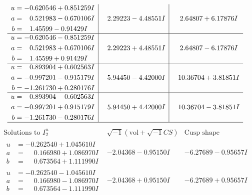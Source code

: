 \documentclass[1p]{elsarticle_modified}
\theoremstyle{definition}
\newcommand{\I}{\sqrt{-1}}
\begin{document}
$$\begin{array}{c|c|c}
\begin{aligned}
u &= -0.620546 + 0.851259 I \\
a &= \phantom{-}0.521983 - 0.670106 I \\
b &= \phantom{-}1.45599 - 0.91429 I\end{aligned}
 & \phantom{-}2.29223 - 4.48551 I & \phantom{-}2.64807 + 6.17876 I \\ \hline\begin{aligned}
u &= -0.620546 - 0.851259 I \\
a &= \phantom{-}0.521983 + 0.670106 I \\
b &= \phantom{-}1.45599 + 0.91429 I\end{aligned}
 & \phantom{-}2.29223 + 4.48551 I & \phantom{-}2.64807 - 6.17876 I \\ \hline\begin{aligned}
u &= \phantom{-}0.893904 + 0.602563 I \\
a &= -0.997201 - 0.915179 I \\
b &= -1.261730 + 0.280176 I\end{aligned}
 & \phantom{-}5.94450 - 4.42000 I & \phantom{-}10.36704 + 3.81851 I \\ \hline\begin{aligned}
u &= \phantom{-}0.893904 - 0.602563 I \\
a &= -0.997201 + 0.915179 I \\
b &= -1.261730 - 0.280176 I\end{aligned}
 & \phantom{-}5.94450 + 4.42000 I & \phantom{-}10.36704 - 3.81851 I\\
 \hline 
 \end{array}$$\newpage$$\begin{array}{c|c|c}  
\text{Solutions to }I^u_{2}& \I (\text{vol} + \sqrt{-1}CS) & \text{Cusp shape}\\
 \hline 
\begin{aligned}
u &= -0.262540 + 1.045610 I \\
a &= \phantom{-}0.166980 + 1.086970 I \\
b &= \phantom{-}0.673564 + 1.111990 I\end{aligned}
 & -2.04368 - 0.95150 I & -6.27689 - 0.95657 I \\ \hline\begin{aligned}
u &= -0.262540 - 1.045610 I \\
a &= \phantom{-}0.166980 - 1.086970 I \\
b &= \phantom{-}0.673564 - 1.111990 I\end{aligned}
 & -2.04368 + 0.95150 I & -6.27689 + 0.95657 I \\ \hline\begin{aligned}

\end{aligned}
\end{array}$$
\end{document}
